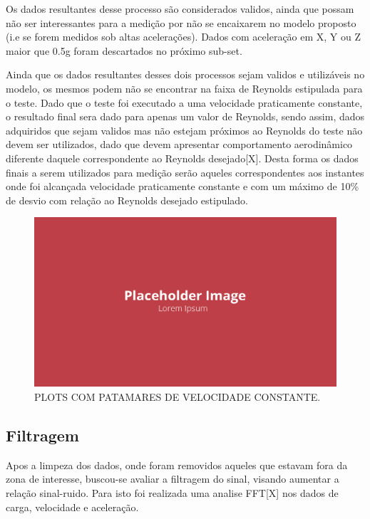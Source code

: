 Os dados resultantes desse processo são considerados validos, ainda que possam não ser interessantes para a medição por não se encaixarem no modelo proposto (i.e se forem medidos sob altas acelerações). Dados com aceleração em X, Y ou Z maior que 0.5g foram descartados no próximo sub-set.

Ainda que os dados resultantes desses dois processos sejam validos e utilizáveis no modelo, os mesmos podem não se encontrar na faixa de Reynolds estipulada para o teste. Dado que o teste foi executado a uma velocidade praticamente constante, o resultado final sera dado para apenas um valor de Reynolds, sendo assim, dados adquiridos que sejam validos mas não estejam próximos ao Reynolds do teste não devem ser utilizados, dado que devem apresentar comportamento aerodinâmico diferente daquele correspondente ao Reynolds desejado[X]. Desta forma os dados finais a serem utilizados para medição serão aqueles correspondentes aos instantes onde foi alcançada velocidade praticamente constante e com um máximo de 10\% de desvio com relação ao Reynolds desejado estipulado.

\begin{figure}[!ht]
    \centering
    \includegraphics[width=.8\linewidth]{figuras/outras/placeholder.png}
    \caption{PLOTS COM PATAMARES DE VELOCIDADE CONSTANTE\cite{autor}.}
    \label{fig:placeholder}
\end{figure}

\subsection{Filtragem}

Apos a limpeza dos dados, onde foram removidos aqueles que estavam fora da zona de interesse, buscou-se avaliar a filtragem do sinal, visando aumentar a relação sinal-ruido. Para isto foi realizada uma analise FFT[X] nos dados de carga, velocidade e aceleração.

